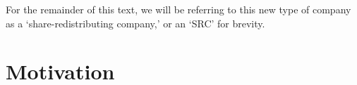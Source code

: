 \documentclass{article}
\begin{document}
For the remainder of this text, we will be referring to this new type of company as a `share-redistributing company,' or an `SRC' for brevity. 







\section{Motivation}
\end{document}

